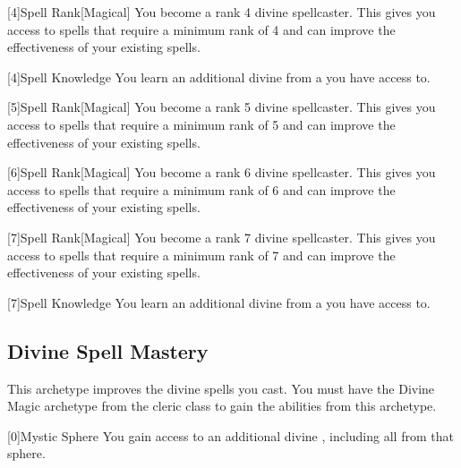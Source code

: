         [4]{Spell Rank}[Magical] You become a rank 4 divine spellcaster.
        This gives you access to spells that require a minimum rank of 4 and can improve the effectiveness of your existing spells.

        [4]{Spell Knowledge} You learn an additional divine  from a  you have access to.

        [5]{Spell Rank}[Magical] You become a rank 5 divine spellcaster.
        This gives you access to spells that require a minimum rank of 5 and can improve the effectiveness of your existing spells.

        [6]{Spell Rank}[Magical] You become a rank 6 divine spellcaster.
        This gives you access to spells that require a minimum rank of 6 and can improve the effectiveness of your existing spells.

        [7]{Spell Rank}[Magical] You become a rank 7 divine spellcaster.
        This gives you access to spells that require a minimum rank of 7 and can improve the effectiveness of your existing spells.

        [7]{Spell Knowledge} You learn an additional divine  from a  you have access to.

    \newpage
    \subsection{Divine Spell Mastery}
        This archetype improves the divine spells you cast.
        You must have the Divine Magic archetype from the cleric class to gain the abilities from this archetype.

        [0]{Mystic Sphere} You gain access to an additional divine , including all  from that sphere.

